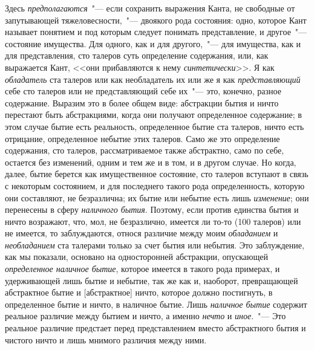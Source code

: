 Здесь \emph{предполагаются}~"--- если сохранить выражения
Канта, не свободные от запутывающей тяжеловесности,~"---
двоякого рода состояния: одно, которое Кант называет
понятием и под которым следует понимать представление,
и другое~"--- состояние имущества. Для одного, как и
для другого,~"--- для имущества, как и для представления,
сто талеров суть определение содержания, или, как
выражается Кант, <<они прибавляются к нему \emph{синтетически}>>.
Я как \emph{обладатель} ста талеров или как необладатель
их или же я как \emph{представляющий} себе сто талеров
или не представляющий себе их~"--- это, конечно, разное
содержание. Выразим это в более общем виде:
абстракции бытия и ничто перестают быть абстракциями,
когда они получают определенное содержание; в этом
случае бытие есть реальность, определенное бытие ста
талеров, ничто есть отрицание, определенное небытие
этих талеров. Само же это определение содержания, сто
талеров, рассматриваемое также абстрактно, само по себе,
остается без изменений, одним и тем же и в том, и в другом
случае. Но когда, далее, бытие берется как имущественное
состояние, сто талеров вступают в связь с некоторым
состоянием, и для последнего такого рода определенность,
которую они составляют, не безразлична; их
бытие или небытие есть лишь \emph{изменение}; они перенесены
в сферу \emph{наличного бытия}. Поэтому, если против
единства бытия и ничто возражают, что, мол, не безразлично,
имеется ли то-то (100 талеров) или не имеется,
то заблуждаются, относя различие между моим \emph{обладанием}
и \emph{необладанием} ста талерами только за счет бытия
или небытия. Это заблуждение, как мы показали, основано
на односторонней абстракции, опускающей \emph{определенное
наличное бытие}, которое имеется в такого рода
примерах, и удерживающей лишь бытие и небытие, так
же как и, наоборот, превращающей абстрактное бытие
и [абстрактное] ничто, которое должно постигнуть, в определенное
бытие и ничто, в наличное бытие. Лишь \emph{наличное
бытие} содержит реальное различие между бытием
и ничто, а именно \emph{нечто} и \emph{иное}.~"--- Это реальное различие
предстает перед представлением вместо абстрактного
бытия и чистого ничто и лишь мнимого различия между
ними.

